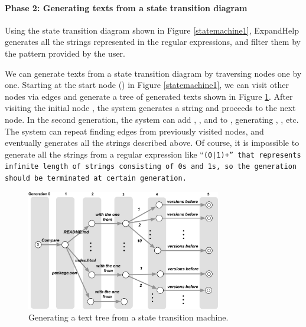 \documentclass{sigchi}
\def\EH{\textsf{ExpandHelp}}
\begin{document}
\paragraph{Phase 2: Generating texts from a state transition diagram}

Using the state transition diagram shown in Figure \ref{statemachine1},
{\EH} generates all the strings represented in the regular expressions,
and filter them by the pattern provided by the user.

We can generate texts from a state transition diagram by traversing nodes one by one.
Starting at the start node
()
in Figure \ref{statemachine1},
we can visit other nodes via edges and generate a tree of generated texts
shown in Figure \ref{gentree1}.
After visiting the initial node
,
the system generates a string  and proceeds to the next node.
In the second generation,
the system can add , , and 
to , generating
, , etc.
The system can repeat finding edges from previously visited nodes,
and eventually generates all the strings described above.
Of course, it is impossible to generate all the strings
from a regular expression like ``\tt{(0|1)+}'' that represents infinite length of
strings consisting of \tt{0}s and \tt{1}s, so the generation should be
terminated at certain generation.

\begin{figure}[htb]
\includegraphics[width=85mm,bb=0 0 643 398]{figures/gentree1.pdf}
\caption{Generating a text tree from a state transition machine.}
\label{gentree1}
\end{figure}
\end{document}

